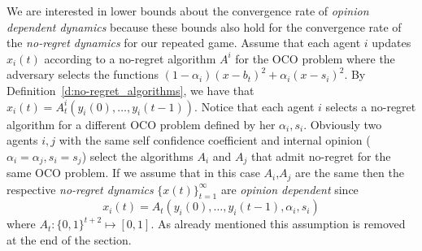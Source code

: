 We are interested in lower bounds about the convergence rate of
\emph{opinion dependent dynamics} because these bounds also hold
for the convergence rate of the \emph{no-regret dynamics} for our repeated game.
Assume that each agent $i$ updates $x_i(t)$ according to a no-regret algorithm $A^i$
for the OCO problem where the adversary selects the functions
$(1-\alpha_i)(x-b_t)^2 + \alpha_i(x-s_i)^2$. By Definition~\ref{d:no-regret_algorithms},
we have that $x_i(t)= A^i_t(y_i(0),\ldots,y_i(t-1))$. Notice that
each agent $i$ selects a no-regret algorithm for a different OCO
problem defined by her $\alpha_i,s_i$. Obviously two agents $i,j$ with the same
self confidence coefficient and internal opinion ($\alpha_i=\alpha_j,s_i=s_j$)
select the algorithms $A_i$ and $A_j$ that admit no-regret for the same OCO problem.
If we assume that in this case $A_i$,$A_j$ are the same then
the respective \emph{no-regret dynamics} $\{x(t)\}_{t=1}^\infty$
are \emph{opinion dependent} since \[x_i(t) = A_t(y_i(0),\ldots,y_i(t-1),\alpha_i,s_i)\]
where $A_t:\{0,1\}^{t+2} \mapsto [0,1]$. As already mentioned this assumption is removed
at the end of the section.

